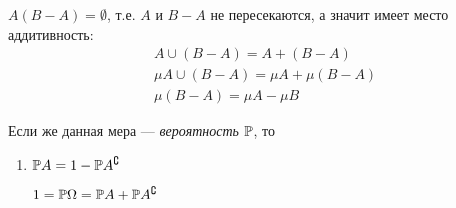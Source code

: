 \begin{itemize}
  \(A (B-A) = \emptyset\), т.е. \(A\) и \(B-A\) не пересекаются, а
  значит имеет место аддитивность: \[\begin{aligned}
     & A \cup (B-A) = A + (B-A) \\
     & \mu A\cup (B-A) = \mu A + \mu (B-A) \\
     & \mu (B-A) = \mu A - \mu B
   \end{aligned}\]
\end{itemize}

Если же данная мера --- \emph{вероятность} \(\mathbb P\), то

\begin{enumerate}
\def\labelenumi{\arabic{enumi}.}
\item
  \(\mathbb P A = 1 - \mathbb P A^\complement\)

  \(1 = \mathbb P \Omega = \mathbb P A + \mathbb P A^\complement\)
\end{enumerate}
